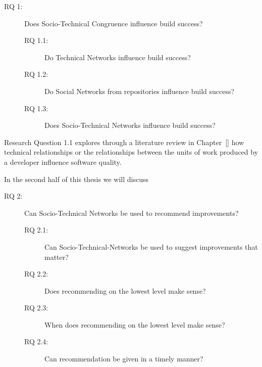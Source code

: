 \begin{description}
% 
\item[RQ 1:] Does Socio-Technical Congruence influence build success?
  \begin{description}
  \item[RQ 1.1:] Do Technical Networks influence build success?
  \item[RQ 1.2:] Do Social Networks from repositories influence build success?
  \item[RQ 1.3:] Does Socio-Technical Networks influence build success?
  \end{description}
%
\end{description}
Research Question 1.1 explores through a literature review in Chapter~\ref{} how technical relationships or the relationships between the units of work produced by a developer influence software quality.



In the second half of this thesis we will discuss

\begin{description}
%
\item[RQ 2:] Can Socio-Technical Networks be used to recommend improvements? 
  \begin{description}
  \item[RQ 2.1:] Can Socio-Technical-Networks be used to suggest improvements that matter?
  \item[RQ 2.2:] Does recommending on the lowest level make sense?
  \item[RQ 2.3:] When does recommending on the lowest level make sense?
  \item[RQ 2.4:] Can recommendation be given in a timely manner?
  \end{description}
\end{description}